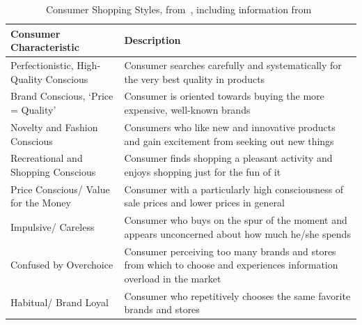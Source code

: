 \begin{table}[ht]
	\begin{tabular}{p{} p{}}
		\toprule
		Consumer Characteristic                 & Description                                                                                                            \\\midrule
		Perfectionistic, High-Quality Conscious & Consumer searches carefully and \newline systematically for the very best quality in products                          \\
		Brand Conscious, `Price = Quality'      & Consumer is oriented towards buying the more expensive, well-known brands                                              \\
		Novelty and Fashion Conscious           & Consumers who like new and innovative products and gain excitement from seeking out new things                         \\
		Recreational and Shopping Conscious     & Consumer finds shopping a pleasant activity and enjoys shopping just for the fun of it                                 \\
		Price Conscious/ Value for the Money    & Consumer with a particularly high consciousness of sale prices and lower prices in general                             \\
		Impulsive/ Careless                     & Consumer who buys on the spur of the moment and appears unconcerned about how much he/she spends                       \\
		Confused by Overchoice                  & Consumer perceiving too many brands and stores from which to choose and experiences information overload in the market \\
		Habitual/ Brand Loyal                   & Consumer who repetitively chooses the same favorite brands and stores                                                  \\\bottomrule
	\end{tabular}
	\caption{Consumer Shopping Styles, from~\cite{ShoppingStyles}, including information from~\cite{ShoppingStyles2}}\label{tab:shoppingStyles}
\end{table}

\newpage

